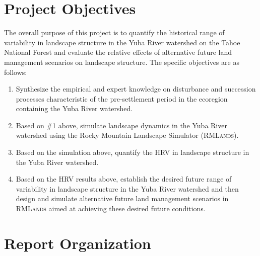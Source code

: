 \section{Project Objectives}
The overall purpose of this project is to quantify the historical range of variability in landscape structure in the Yuba River watershed on the Tahoe National Forest and evaluate the relative effects of  alternative future land management scenarios on landscape structure. The specific objectives are as follows:
\begin{enumerate}
	\item Synthesize the empirical and expert knowledge on disturbance and succession processes characteristic of the pre-settlement period in the ecoregion containing the Yuba River watershed.
	\item Based on \#1 above, simulate landscape dynamics in the Yuba River watershed using the Rocky Mountain Landscape Simulator (\textsc{RMLands}).
	\item Based on the simulation above, quantify the HRV in landscape structure in the Yuba River watershed.
	\item Based on the HRV results above, establish the desired future range of variability in landscape structure in the Yuba River watershed and then design and simulate alternative future land management scenarios in \textsc{RMLands} aimed at achieving these desired future conditions.
\end{enumerate}


\section{Report Organization}